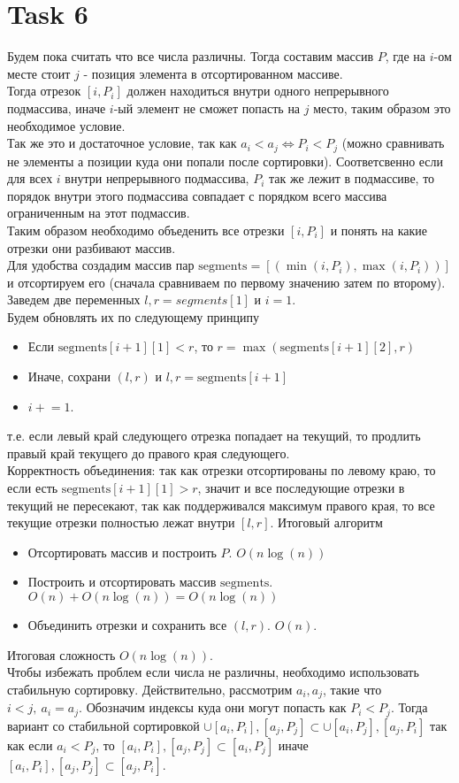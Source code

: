 \documentclass[12pt]{exam}
\newcommand{\pluseq}{\mathrel{+}=}
\begin{document}
\section*{Task 6}
Будем пока считать что все числа различны. 
Тогда составим массив $P$, где 
на $i$-ом месте стоит $j$ - позиция элемента в отсортированном массиве. \\
Тогда отрезок $[i, P_{i}]$ должен находиться внутри одного непрерывного подмассива, 
иначе $i$-ый элемент не сможет попасть на $j$ место, таким образом это необходимое условие. \\
Так же это и достаточное условие, 
так как $a_i < a_j \Leftrightarrow P_{i} < P_{j}$ 
(можно сравнивать не элементы а позиции куда они попали после сортировки). 
Соответсвенно если для всех $i$ внутри непрерывного подмассива, $P_{i}$ так же лежит в подмассиве,
то порядок внутри этого подмассива совпадает с порядком всего массива ограниченным на этот подмассив. \\
Таким образом необходимо объеденить все отрезки $[i, P_{i}]$ и понять на какие отрезки они разбивают массив. \\
Для удобства создадим массив пар $\mathrm{segments} = [(\min(i, P_{i}), \max(i, P_{i}))]$ 
и отсортируем его (сначала сравниваем по первому значению затем по второму).
Заведем две переменных $l, r = segments[1]$ и $i = 1$. \\
Будем обновлять их по следующему принципу 
\begin{itemize}
    \item Если $\mathrm{segments}[i + 1][1] < r$, то $r = \max(\mathrm{segments}[i + 1][2], r)$
    \item Иначе, сохрани $(l, r)$ и $l, r = \mathrm{segments}[i + 1]$
    \item $i \pluseq 1$.
\end{itemize}
т.е. если левый край следующего отрезка попадает на текущий, то продлить правый край текущего до правого края следующего.\\
Корректность объединения: 
так как отрезки отсортированы по левому краю, то если есть $\mathrm{segments}[i + 1][1] > r$, значит и все последующие отрезки в текущий не пересекают,
так как поддерживался максимум правого края, то все текущие отрезки полностью лежат внутри $[l, r]$. 
Итоговый алгоритм
\begin{itemize}
    \item Отсортировать массив и построить $P$. $O(n \log(n))$
    \item Построить и отсортировать массив $\mathrm{segments}$. $O(n) + O(n \log(n)) = O(n \log(n))$
    \item Объединить отрезки и сохранить все $(l, r)$. $O(n)$.
\end{itemize}
Итоговая сложность $O(n \log(n))$.\\
Чтобы избежать проблем если числа не различны, необходимо использовать стабильную сортировку.
Действительно, рассмотрим $a_i, a_j$, такие что $i < j, \: a_i = a_j$. 
Обозначим индексы куда они могут попасть как $P_i < P_j$. 
Тогда вариант со стабильной сортировкой $\cup [a_i, P_i], [a_j, P_j] \subset \cup [a_i, P_j], [a_j, P_i]$ 
так как если $a_i < P_j$, то $[a_i, P_i], [a_j, P_j] \subset [a_i, P_j]$ иначе $[a_i, P_i], [a_j, P_j] \subset [a_j, P_i]$.
\end{document}
